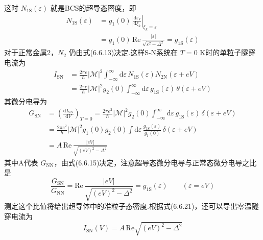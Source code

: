 这时 $N_{1\mathrm{S}}(\varepsilon)$ 就是BCS的超导态密度，即
\begin{equation}
\begin{aligned}
  N_{1\mathrm{S}}(\varepsilon)
  &=g_{1}(0)\left|\frac{\mathrm{d}\varepsilon_{k}}{\mathrm{d}\xi_{k}}\right|_{\xi_{k}=\varepsilon}\\
  &=g_{1}(0)\,\mathrm{Re}\,\frac{|\varepsilon|}{\sqrt{\varepsilon^{2}-\Delta^{2}}}
  =g_{1\mathrm{S}}(\varepsilon)
\end{aligned}
\end{equation}
对于正常金属2，$N_{2}$ 仍由式(6.6.13)决定.这样S-N系统在 $T=0$ K时的单粒子隧穿电流为
\begin{equation}
\begin{aligned}
  I_{\mathrm{SN}}&=\frac{2\pi e}{\hbar}|\mathscr{M}|^{2}
  \int_{-\infty}^{\infty}\mathrm{d}\varepsilon\,
  N_{1\mathrm{S}}(\varepsilon)N_{2\mathrm{N}}(\varepsilon+eV)\\
  &=\frac{2\pi e}{\hbar}|\mathscr{M}|^{2}g_{2}(0)
  \int_{-\infty}^{\infty}\mathrm{d}\varepsilon\,
  g_{1\mathrm{S}}(\varepsilon)\,\theta(\varepsilon+eV)
\end{aligned}
\end{equation}
其微分电导为
\begin{equation}
\begin{aligned}
  G_{\mathrm{SN}}&=\left(\frac{\mathrm{d}I_{\mathrm{SN}}}{\mathrm{d}V}\right)_{T=0}
  =\frac{2\pi e^{2}}{\hbar}|\mathscr{M}|^{2}g_{2}(0)
  \int_{-\infty}^{\infty}\mathrm{d}\varepsilon\,
  g_{1\mathrm{S}}(\varepsilon)\,\delta\left(\varepsilon+eV\right)\\
  &=\frac{2\pi e^{2}}{\hbar}|\mathscr{M}|^{2}g_{1}(0)g_{2}(0)
  \int\mathrm{d}\varepsilon\,\frac{g_{1\mathrm{S}}(\varepsilon)}{g_{1}(0)}
  \,\delta(\varepsilon+eV)\\
  &=A\,\mathrm{Re}\,\frac{|eV|}{\sqrt{(eV)^{2}-\Delta^{2}}}
\end{aligned}
\end{equation}
其中A代表 $G_{\mathrm{NN}}$，由式(6.6.15)决定，注意超导态微分电导与正常态微分电导之比是
\begin{equation}
  \frac{G_{\mathrm{SN}}}{G_{\mathrm{NN}}}
  =\mathrm{Re}\,\frac{|eV|}{\sqrt{(eV)^{2}-\Delta^{2}}}
  =g_{1\mathrm{S}}(\varepsilon)\qquad(\varepsilon=eV)
\end{equation}
测定这个比值将给出超导体中的准粒子态密度.根据式(6.6.21)，还可以导出零温隧穿电流为
\begin{equation}
  I_{\mathrm{SN}}(V)=A\,\mathrm{Re}\sqrt{(eV)^{2}-\Delta^{2}}
\end{equation}
